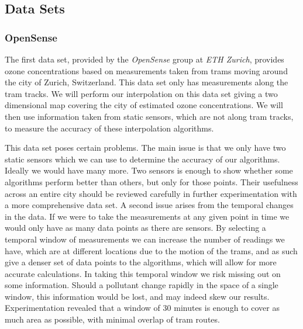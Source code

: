 		\subsection{Data Sets}\label{prediction_evaluation_methodology_data_sets}

			\subsubsection{OpenSense}\label{prediction_evaluation_methodology_data_sets_opensense}
				The first data set, provided by the \emph{OpenSense} group at \emph{ETH Zurich}, provides ozone concentrations based on measurements taken from trams moving around the city of Zurich, Switzerland. This data set only has measurements along the tram tracks. We will perform our interpolation on this data set giving a two dimensional map covering the city of estimated ozone concentrations. We will then use information taken from static sensors, which are not along tram tracks, to measure the accuracy of these interpolation algorithms. 

				 

				This data set poses certain problems. The main issue is that we only have two static sensors which we can use to determine the accuracy of our algorithms. Ideally we would have many more. Two sensors is enough to show whether some algorithms perform better than others, but only for those points. Their usefulness across an entire city should be reviewed carefully in further experimentation with a more comprehensive data set. A second issue arises from the temporal changes in the data. If we were to take the measurements at any given point in time we would only have as many data points as there are sensors. By selecting a temporal window of measurements we can increase the number of readings we have, which are at different locations due to the motion of the trams, and as such give a denser set of data points to the algorithms, which will allow for more accurate calculations. In taking this temporal window we risk missing out on some information. Should a pollutant change rapidly in the space of a single window, this information would be lost, and may indeed skew our results. Experimentation revealed that a window of 30 minutes is enough to cover as much area as possible, with minimal overlap of tram routes. 


